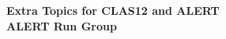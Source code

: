 \begin{titlepage}
     \begin{center}
       \vspace*{-1.5cm}
        \\
       \vspace*{0.2cm}
        \\
       \vspace*{2.3cm}
       \noindent \Huge \textbf{Extra Topics for CLAS12 and ALERT} \\
       \vspace*{0.6cm}
       \noindent \Large \textbf{ALERT Run Group} \\
       \vspace*{0.7cm}
     \end{center}
   

\end{titlepage}
